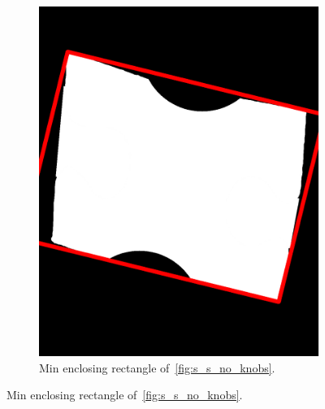 \documentclass{article}
\begin{document}
\begin{figure}
\begin{subfigure}{0.3\textwidth}
    \includegraphics[width=\linewidth]{pictures/find_corners_min_enclosing_rectangle.png}
    \caption{Min enclosing rectangle of~\ref{fig:s_s_no_knobs}.}
    \label{fig:s_s_min_enc_rec}
  \end{subfigure}
\end{figure}
\clearpage
\end{document}
